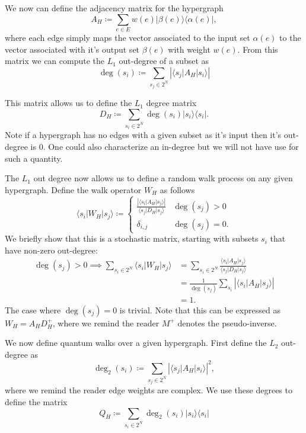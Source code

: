 \documentclass{article}
\newcommand{\ket}[1]{|#1\rangle}
\newcommand{\bra}[1]{\langle #1|}
\newcommand{\ketbra}[2]{| #1\rangle\! \langle #2|}
\newcommand{\abs}[1]{\left| #1 \right|}
\newcommand{\basei}{\ket{s_i}}
\newcommand{\base}[1]{\ket{s_{#1}}}
\newcommand{\dual}[1]{\bra{s_{#1}}}
\begin{document}
We now can define the adjacency matrix for the hypergraph
\begin{equation}
    A_H \coloneqq \sum_{e \in E} w(e) \ketbra{\beta(e)}{\alpha(e)},
\end{equation}
where each edge simply maps the vector associated to the input set $\alpha(e)$ to the vector associated with it's output set $\beta(e)$ with weight $w(e)$. From this matrix we can compute the $L_1$ out-degree of a subset as
\begin{equation}
    \deg(s_i) \coloneqq \sum_{s_j \in 2^N} \abs{\dual{j} A_H \basei}
\end{equation}

This matrix allows us to define the $L_1$ degree matrix
\begin{equation}
    D_H \coloneqq \sum_{s_i \in 2^N} \deg(s_i) \ketbra{s_i}{s_i}.
\end{equation}
Note if a hypergraph has no edges with a given subset as it's input then it's out-degree is 0. One could also characterize an in-degree but we will not have use for such a quantity.

The $L_1$ out degree now allows us to define a random walk process on any given hypergraph. Define the walk operator $W_H$ as follows
\begin{equation}
    \dual{i} W_H \base{j} \coloneqq \begin{cases}
        \frac{\abs{\dual{i} A_H \base{j}}}{\dual{j} D_H \base{j}} & \deg(s_j) > 0 \\
        \delta_{i,j} & \deg(s_j) = 0.
    \end{cases}
\end{equation}
We briefly show that this is a stochastic matrix, starting with subsets $s_i$ that have non-zero out-degree:
\begin{align}
    \deg(s_j) > 0 \implies \sum_{s_i \in 2^N} \dual{i} W_H \base{j} &= \sum_{s_i \in 2^N } \frac{\dual{i} A_H \base{j}}{\dual{j} D_H \base{j}} \\
    &= \frac{1}{\deg(s_j)} \sum_{s_i} \abs{\dual{i} A_H \base{j}} \\
    &= 1.
\end{align}
The case where $\deg(s_j) = 0$ is trivial. Note that this can be expressed as $W_H = A_H D_H^{+}$, where we remind the reader $M^+$ denotes the pseudo-inverse.

We now define quantum walks over a given hypergraph. First define the $L_2$ out-degree as 
\begin{equation}
\deg_2(s_i) \coloneqq \sum_{s_j \in 2^N} \abs{\dual{j} A_H \base{i}}^2,
\end{equation}
where we remind the reader edge weights are complex. We use these degrees to define the matrix
\begin{equation}
    Q_H \coloneqq \sum_{s_i \in 2^N} \deg_2(s_i) \base{i} \dual{i}
\end{equation}
\end{document}
